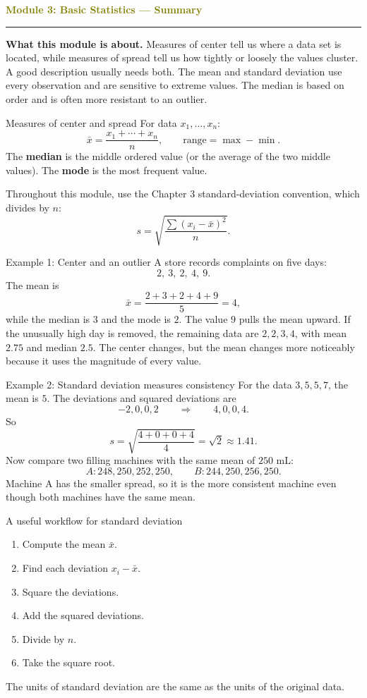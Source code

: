 \documentclass[11pt]{article}
\newcommand{\summaryhead}[2]{%
  \clearpage
  {\Large\bfseries\textcolor{olive}{Module #1: #2 — Summary}}\par
  \vspace{2pt}\textcolor{gold}{\rule{\linewidth}{1.2pt}}\par\smallskip
}
\begin{document}
\summaryhead{3}{Basic Statistics}

\textbf{What this module is about.} Measures of center tell us where a data set is located, while measures of spread tell us how tightly or loosely the values cluster. A good description usually needs both. The mean and standard deviation use every observation and are sensitive to extreme values. The median is based on order and is often more resistant to an outlier.

\begin{keybox}{Measures of center and spread}
For data \(x_1,\ldots,x_n\):
\[
\bar x=\frac{x_1+\cdots+x_n}{n},
\qquad
\text{range}=\max-\min.
\]
The \textbf{median} is the middle ordered value (or the average of the two middle values). The \textbf{mode} is the most frequent value.

Throughout this module, use the Chapter 3 standard-deviation convention, which divides by \(n\):
\[
s=\sqrt{\frac{\sum (x_i-\bar x)^2}{n}}.
\]
\end{keybox}

\begin{examplebox}{Example 1: Center and an outlier}
A store records complaints on five days:
\[
2,\ 3,\ 2,\ 4,\ 9.
\]
The mean is
\[
\bar x=\frac{2+3+2+4+9}{5}=4,
\]
while the median is \(3\) and the mode is \(2\). The value \(9\) pulls the mean upward. If the unusually high day is removed, the remaining data are \(2,2,3,4\), with mean \(2.75\) and median \(2.5\). The center changes, but the mean changes more noticeably because it uses the magnitude of every value.
\end{examplebox}

\begin{examplebox}{Example 2: Standard deviation measures consistency}
For the data \(3,5,5,7\), the mean is \(5\). The deviations and squared deviations are
\[
-2,0,0,2
\qquad\Longrightarrow\qquad
4,0,0,4.
\]
So
\[
s=\sqrt{\frac{4+0+0+4}{4}}=\sqrt2\approx1.41.
\]
Now compare two filling machines with the same mean of \(250\) mL:
\[
A:248,250,252,250,
\qquad
B:244,250,256,250.
\]
Machine A has the smaller spread, so it is the more consistent machine even though both machines have the same mean.
\end{examplebox}

\begin{keybox}{A useful workflow for standard deviation}
\begin{enumerate}[label=\arabic*.]
\item Compute the mean \(\bar x\).
\item Find each deviation \(x_i-\bar x\).
\item Square the deviations.
\item Add the squared deviations.
\item Divide by \(n\).
\item Take the square root.
\end{enumerate}
The units of standard deviation are the same as the units of the original data.
\end{keybox}
\end{document}

